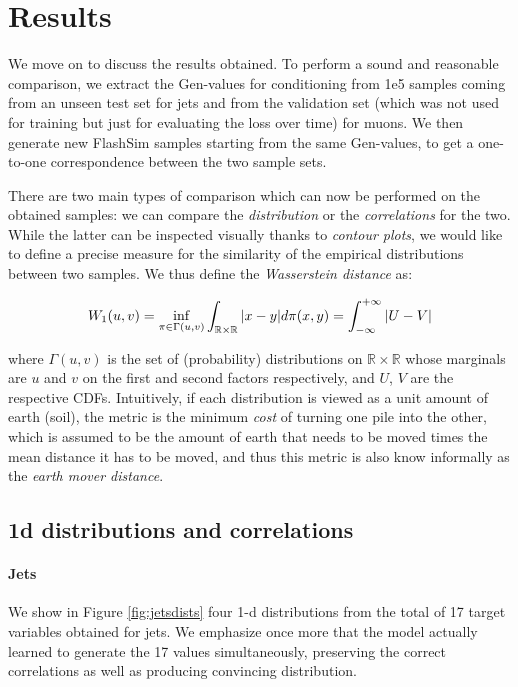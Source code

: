 \section{Results}

We move on to discuss the results obtained. 
To perform a sound and reasonable comparison, we extract the Gen-values for conditioning from 1e5 samples coming from an unseen test set for jets and from the validation set (which was not used for training but just for evaluating the loss over time) for muons. We then generate new FlashSim samples starting from the same Gen-values, to get a one-to-one correspondence between the two sample sets.

There are two main types of comparison which can now be performed on the obtained samples: we can compare the \emph{distribution} or the \emph{correlations} for the two.
While the latter can be inspected visually thanks to \emph{contour plots}, we would like to define a precise measure for the similarity of the empirical distributions between two samples. We thus define the \emph{Wasserstein distance} as:

\[W_1(u, v) = \inf_{\pi \in \Gamma(u, v)}\int_{\mathbb{R}\times\mathbb{R}}\abs{x-y}d\pi(x,y) = \int_{-\infty}^{+\infty} \abs{U - V}\]

where $\Gamma(u, v)$ is the set of (probability) distributions on $\mathbb{R}\times\mathbb{R}$ whose marginals are $u$ and $v$ on the first and second factors respectively, and $U$, $V$ are the respective CDFs. Intuitively, if each distribution is viewed as a unit amount of earth (soil), the metric is the minimum \emph{cost} of turning one pile into the other, which is assumed to be the amount of earth that needs to be moved times the mean distance it has to be moved, and thus this metric is also know informally as the \emph{earth mover distance}.

\subsection{1d distributions and correlations}


\paragraph{Jets}

We show in Figure \ref{fig:jetsdists} four 1-d distributions from the total of 17 target variables obtained for jets. We emphasize once more that the model actually learned to generate the 17 values simultaneously, preserving the correct correlations as well as producing convincing distribution.


